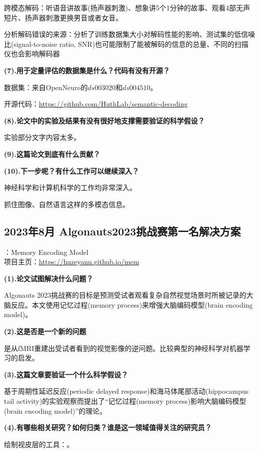 \documentclass[12pt, a4paper, oneside]{ctexart}
\begin{document}
    跨模态解码：听语音讲故事(扬声器刺激)、想象讲5个1分钟的故事、观看4部无声短片、扬声器刺激更换男音或者女音。

    分析解码错误的来源：分析了训练数据集大小对解码性能的影响、测试集的低信噪比(signal-to-noise ratio, SNR)也可能限制了能被解码的信息的总量、不同的扫描仪也会影响解码器

    \noindent\textbf{(7).用于定量评估的数据集是什么？代码有没有开源？}

    数据集：来自OpenNeuro的$ds003020$和$ds004510$。

    开源代码：\url{https://github.com/HuthLab/semantic-decoding}

    \noindent\textbf{(8).论文中的实验及结果有没有很好地支撑需要验证的科学假设？}

    实验部分文字内容太多。

    \noindent\textbf{(9).这篇论文到底有什么贡献？}

    \noindent\textbf{(10).下一步呢？有什么工作可以继续深入？}

    神经科学和计算机科学的工作均非常深入。

    抓住图像、自然语言这样的多模态信息。

    \subsection{2023年8月 Algonauts2023挑战赛第一名解决方案\cite{yang2023memory}}
    ：Memory Encoding Model\\
    项目主页：\url{https://huzeyann.github.io/mem}

    \noindent\textbf{(1).论文试图解决什么问题？}

    Algonauts 2023挑战赛的目标是预测受试者观看复杂自然视觉场景时所被记录的大脑反应。本文使用记忆过程(memory process)来增强大脑编码模型(brain encoding model)。

    \noindent\textbf{(2).这是否是一个新的问题}

    是从fMRI重建出受试者看到的视觉影像的逆问题。比较典型的神经科学对机器学习的启发。

    \noindent\textbf{(3).这篇文章要验证一个什么科学假设？}

    基于周期性延迟反应(periodic delayed response)和海马体尾部活动(hippocampus tail activity)的实验观察而提出了“记忆过程(memory process)影响大脑编码模型(brain encoding model)”的理论。

    \noindent\textbf{(4).有哪些相关研究？如何归类？谁是这一领域值得关注的研究员？}

    绘制视皮层的工具：{}。
\end{document}
